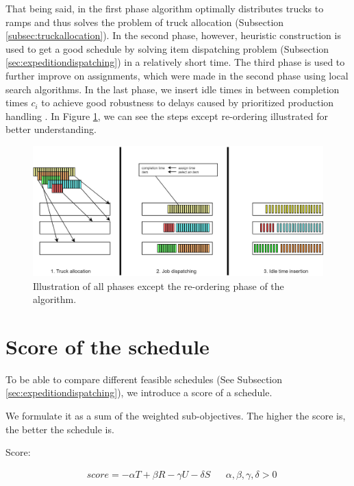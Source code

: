\documentclass{ctuthesis}
\begin{document}
That being said, in the first phase algorithm optimally distributes trucks to ramps and thus solves the problem of truck allocation (Subsection \ref{subsec:truckallocation}). In the second phase, however, heuristic construction is used to get a good schedule by solving item dispatching problem (Subsection \ref{sec:expeditiondispatching}) in a relatively short time. The third phase is used to further improve on assignments, which were made in the second phase using local search algorithms. In the last phase, we insert idle times in between completion times $c_i$ to achieve good robustness to delays caused by prioritized production handling \cite{pinedo}. In Figure \ref{fig:algo}, we can see the steps except re-ordering illustrated for better understanding.

\begin{figure}[H]
\includegraphics[width=1.0\linewidth]{algo.jpg}
\caption{Illustration of all phases except the re-ordering phase of the algorithm.}
\label{fig:algo}
\end{figure}

\section{Score of the schedule}
\label{sec:score}

To be able to compare different feasible schedules (See Subsection \ref{sec:expeditiondispatching}), we introduce a score of a schedule. 

We formulate it as a sum of the weighted sub-objectives. The higher the score is, the better the schedule is.

Score:

\begin{equation}
\begin{aligned}
    &score = -\alpha T + \beta R - \gamma  U - \delta S && \alpha, \beta, \gamma, \delta > 0
\end{aligned}
\end{equation}
\end{document}
